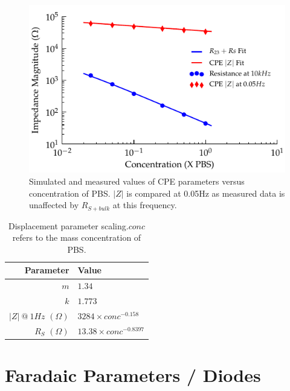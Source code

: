 \documentclass[journal, a4paper]{IEEEtran}
\begin{document}
\begin{figure}
    \begin{center}
        \includegraphics{graphics/scalingFactors_Displacement_IEEE}
    \end{center}
    \caption{Simulated and measured values of CPE parameters versus concentration of PBS. $|Z|$ is compared at 0.05\thinspace Hz as measured data is unaffected by $R_{S+bulk}$ at this frequency.}
    \label{fig:CPE_Scaling}
\end{figure}

\begin{table}
    \caption{Displacement parameter scaling.\hspace{\textwidth}$conc$ refers to the mass concentration of PBS.}
    \label{tab:CPEparams}
    \begin{center}
        \begin{tabular}{r | l}
            Parameter & Value \\
            \hline
            $m$ & $1.34$ \\
            $k$ & $1.773$\\
            $|Z|\: @\: 1Hz$ $(\Omega)$& $3284 \times conc^{-0.158}$ \\
            $R_{S}$ $(\Omega)$& $13.38 \times conc^{-0.8397} $\\
        \end{tabular}
    \end{center}
\end{table}



\section{Faradaic Parameters {\color{blue}/ Diodes}}
\label{sect:faradaic}
\end{document}
